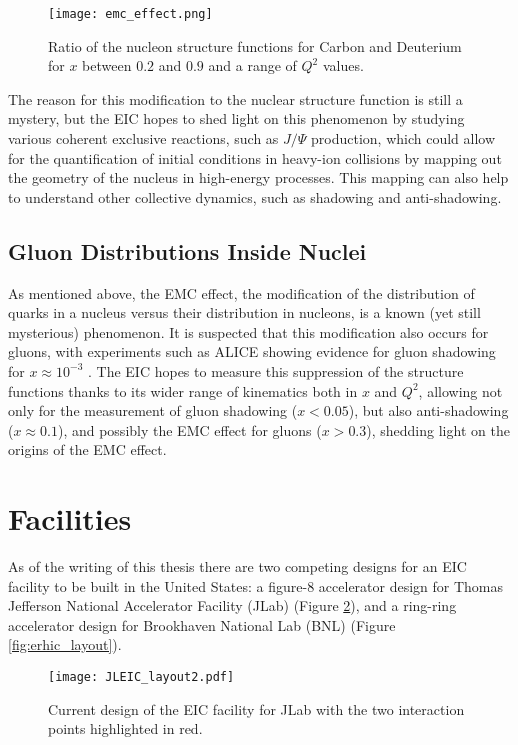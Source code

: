\begin{figure}[ht]
	\centering
	\texttt{[image: emc\_effect.png]}
	\caption{Ratio of the nucleon structure functions for Carbon and Deuterium for $x$ between $0.2$ and $0.9$ and a range of $Q^2$ values.}
	\label{fig:emc_effect}
\end{figure}

The reason for this modification to the nuclear structure function is still a mystery, but the EIC hopes to shed light on this phenomenon by studying various coherent exclusive reactions, such as $J/\Psi$ production, which could allow for the quantification of initial conditions in heavy-ion collisions by mapping out the geometry of the nucleus in high-energy processes. This mapping can also help to understand other collective dynamics, such as shadowing and anti-shadowing.

\subsection{Gluon Distributions Inside Nuclei}
As mentioned above, the EMC effect, the modification of the distribution of quarks in a nucleus versus their distribution in nucleons, is a known (yet still mysterious) phenomenon. It is suspected that this modification also occurs for gluons, with experiments such as ALICE showing evidence for gluon shadowing for $x \approx 10^{-3}$ \cite{ALICE_antishadowing}. The EIC hopes to measure this suppression of the structure functions thanks to its wider range of kinematics both in $x$ and $Q^2$, allowing not only for the measurement of gluon shadowing ($x < 0.05$), but also anti-shadowing ($x \approx 0.1$), and possibly the EMC effect for gluons ($x > 0.3$), shedding light on the origins of the EMC effect.

\section{Facilities}
As of the writing of this thesis there are two competing designs for an EIC facility to be built in the United States: a figure-8 accelerator design for Thomas Jefferson National Accelerator Facility (JLab) (Figure \ref{fig:jleic_layout}), and a ring-ring accelerator design for Brookhaven National Lab (BNL) (Figure \ref{fig:erhic_layout}).

\begin{figure}[ht]
	\centering
	\texttt{[image: JLEIC\_layout2.pdf]}
	\caption{Current design of the EIC facility for JLab with the two interaction points highlighted in red.}
	\label{fig:jleic_layout}
\end{figure}

